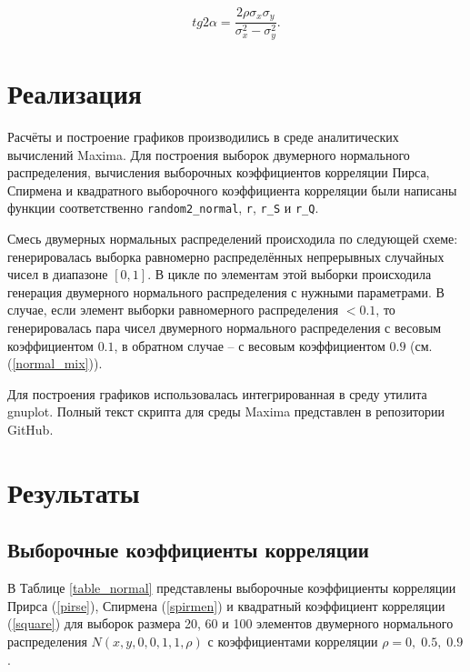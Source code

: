 \documentclass[12pt]{article}
\begin{document}
\begin{flushleft}
    \begin{equation}
        tg 2\alpha = \frac{2\rho\sigma_x\sigma_y}{\sigma_x^2 - \sigma_y^2}.
    \end{equation} 

\newpage

\section{Реализация}

    Расчёты и построение графиков производились в среде аналитических вычислений Maxima. Для построения выборок двумерного нормального распределения, вычисления выборочных коэффициентов корреляции Пирса, Спирмена и квадратного выборочного коэффициента корреляции были написаны функции соответственно \texttt{random2\_normal}, \texttt{r}, \texttt{r\_S} и \texttt{r\_Q}. 
    
    Смесь двумерных нормальных распределений происходила по следующей схеме: генерировалась выборка равномерно распределённых непрерывных случайных чисел в диапазоне $[0, 1]$. В цикле по элементам этой выборки происходила генерация двумерного нормального распределения с нужными параметрами. В случае, если элемент выборки равномерного распределения $< 0.1$, то генерировалась пара чисел двумерного нормального распределения с весовым коэффициентом $0.1$, в обратном случае -- с весовым коэффициентом $0.9$ (см. (\ref{normal_mix})). 
    
    Для построения графиков использовалась интегрированная в среду утилита gnuplot. Полный текст скрипта для среды Maxima представлен в репозитории GitHub.

\newpage

\section{Результаты}

    \subsection{Выборочные коэффициенты корреляции}

        В Таблице \ref{table_normal} представлены выборочные коэффициенты корреляции Прирса (\ref{pirse}), Спирмена (\ref{spirmen}) и квадратный коэффициент корреляции (\ref{square}) для выборок размера 20, 60 и 100 элементов двумерного нормального распределения $N(x, y, 0, 0, 1, 1, \rho)$ с коэффициентами корреляции $\rho = 0, \; 0.5, \; 0.9$.


\end{flushleft}
\end{document}
